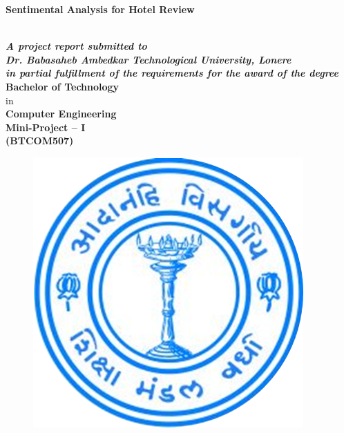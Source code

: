 \documentclass[a4paper, 12pt]{report}
\begin{document}
\newenvironment{frontmatter}{}{}
\begin{frontmatter}
\begin{titlepage}
\begin{center}	
	\begin{LARGE}
		{\textbf {Sentimental Analysis for Hotel Review}}
	\end{LARGE}\\[0.5cm]
	
	\textit{\textbf{A project report submitted to}}\\
	\textit{\textbf{Dr. Babasaheb Ambedkar Technological University, Lonere}}\\
	\textit{\textbf{in partial fulfillment of the requirements for the award of the degree}}\\[0.5cm]
	\textup{\large \textbf{Bachelor of Technology}\\[0.1cm]
		in\\[0.1cm]
		\textbf{Computer Engineering}}\\[0.2cm]	
		\vspace{0.5cm}
		\textbf{\large Mini-Project – I}\\[0.25cm]\textbf{\small (BTCOM507)}

	\begin{center}
		\begin{figure}[h]  %
		\centering
		\includegraphics[width=0.25\linewidth]{./logo1}
		\end{figure}
	\end{center}


\end{center}
\end{titlepage}
\end{frontmatter}
\end{document}
